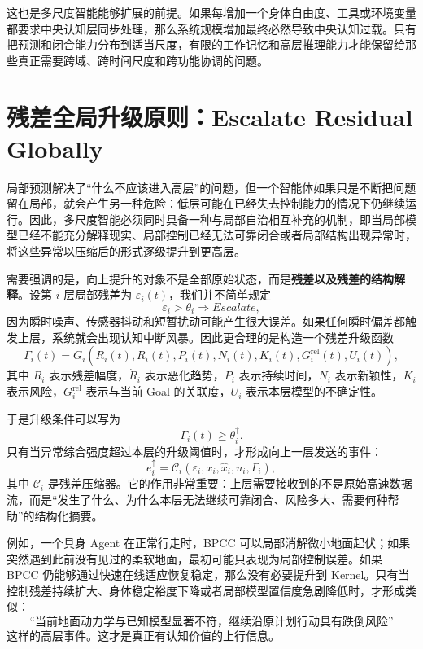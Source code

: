 这也是多尺度智能能够扩展的前提。如果每增加一个身体自由度、工具或环境变量都要求中央认知层同步处理，那么系统规模增加最终必然导致中央认知过载。只有把预测和闭合能力分布到适当尺度，有限的工作记忆和高层推理能力才能保留给那些真正需要跨域、跨时间尺度和跨功能协调的问题。

\section{残差全局升级原则：Escalate Residual Globally}

局部预测解决了``什么不应该进入高层''的问题，但一个智能体如果只是不断把问题留在局部，就会产生另一种危险：低层可能在已经失去控制能力的情况下仍继续运行。因此，多尺度智能必须同时具备一种与局部自治相互补充的机制，即当局部模型已经不能充分解释现实、局部控制已经无法可靠闭合或者局部结构出现异常时，将这些异常以压缩后的形式逐级提升到更高层。

需要强调的是，向上提升的对象不是全部原始状态，而是\textbf{残差以及残差的结构解释}。设第 $i$ 层局部残差为 $\varepsilon_i(t)$，我们并不简单规定
\[
\varepsilon_i>\theta_i
\Rightarrow
Escalate,
\]
因为瞬时噪声、传感器抖动和短暂扰动可能产生很大误差。如果任何瞬时偏差都触发上层，系统就会出现认知中断风暴。因此更合理的是构造一个残差升级函数
\begin{equation}
\Gamma_i(t)
=
G_i
\left(
R_i(t),
\dot{R}_i(t),
P_i(t),
N_i(t),
K_i(t),
G_i^{\mathrm{rel}}(t),
U_i(t)
\right),
\end{equation}
其中 $R_i$ 表示残差幅度，$\dot{R}_i$ 表示恶化趋势，$P_i$ 表示持续时间，$N_i$ 表示新颖性，$K_i$ 表示风险，$G_i^{\mathrm{rel}}$ 表示与当前 Goal 的关联度，$U_i$ 表示本层模型的不确定性。

于是升级条件可以写为
\begin{equation}
\Gamma_i(t)\geq \theta_i^{\uparrow}.
\end{equation}
只有当异常综合强度超过本层的升级阈值时，才形成向上一层发送的事件：
\begin{equation}
e_i^{\uparrow}
=
\mathcal{C}_i
\left(
\varepsilon_i,
x_i,
\hat{x}_i,
u_i,
\Gamma_i
\right),
\end{equation}
其中 $\mathcal{C}_i$ 是残差压缩器。它的作用非常重要：上层需要接收到的不是原始高速数据流，而是``发生了什么、为什么本层无法继续可靠闭合、风险多大、需要何种帮助''的结构化摘要。

例如，一个具身 Agent 在正常行走时，BPCC 可以局部消解微小地面起伏；如果突然遇到此前没有见过的柔软地面，最初可能只表现为局部控制误差。如果 BPCC 仍能够通过快速在线适应恢复稳定，那么没有必要提升到 Kernel。只有当控制残差持续扩大、身体稳定裕度下降或者局部模型置信度急剧降低时，才形成类似：
\[
\text{``当前地面动力学与已知模型显著不符，继续沿原计划行动具有跌倒风险''}
\]
这样的高层事件。这才是真正有认知价值的上行信息。

